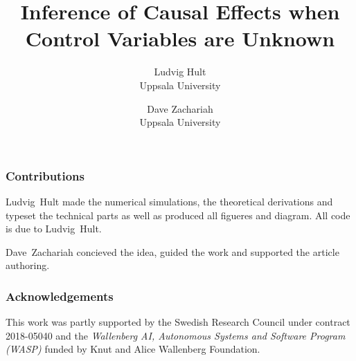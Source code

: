 \documentclass[twocolumn]{article}
\title{Inference of Causal Effects when Control Variables are Unknown}
\author{ Ludvig Hult\\Uppsala University \and Dave Zachariah\\Uppsala University }
\date{}
\theoremstyle{plain}
\theoremstyle{remark}
\begin{document}
\maketitle








\subsubsection*{Contributions}
    Ludvig~Hult made the numerical simulations, the theoretical derivations and typeset the technical parts as well as produced all figueres and diagram.
    All code is due to Ludvig~Hult.

    Dave~Zachariah concieved the idea, guided the work and supported the article authoring.

\subsubsection*{Acknowledgements}
    This work was partly supported by the Swedish Research Council under contract 2018-05040  and the \emph{Wallenberg AI, Autonomous Systems and Software Program (WASP)} funded by Knut and Alice Wallenberg Foundation.



\clearpage
\onecolumn

\end{document}
